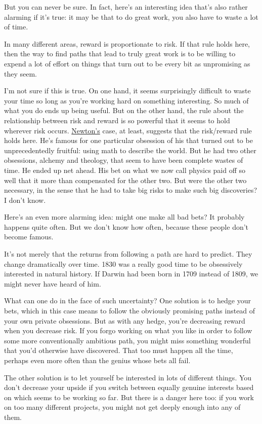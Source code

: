 \documentclass[12pt]{book}
\begin{document}
But you can never be sure. In fact, here's an interesting idea that's
also rather alarming if it's true: it may be that to do great work, you
also have to waste a lot of time.

In many different areas, reward is proportionate to risk. If that rule
holds here, then the way to find paths that lead to truly great work is
to be willing to expend a lot of effort on things that turn out to be
every bit as unpromising as they seem.

I'm not sure if this is true. On one hand, it seems surprisingly
difficult to waste your time so long as you're working hard on something
interesting. So much of what you do ends up being useful. But on the
other hand, the rule about the relationship between risk and reward is
so powerful that it seems to hold wherever risk occurs.
\href{disc.html}{Newton's} case, at least, suggests that the risk/reward
rule holds here. He's famous for one particular obsession of his that
turned out to be unprecedentedly fruitful: using math to describe the
world. But he had two other obsessions, alchemy and theology, that seem
to have been complete wastes of time. He ended up net ahead. His bet on
what we now call physics paid off so well that it more than compensated
for the other two. But were the other two necessary, in the sense that
he had to take big risks to make such big discoveries? I don't know.

Here's an even more alarming idea: might one make all bad bets? It
probably happens quite often. But we don't know how often, because these
people don't become famous.

It's not merely that the returns from following a path are hard to
predict. They change dramatically over time. 1830 was a really good time
to be obsessively interested in natural history. If Darwin had been born
in 1709 instead of 1809, we might never have heard of him.

What can one do in the face of such uncertainty? One solution is to
hedge your bets, which in this case means to follow the obviously
promising paths instead of your own private obsessions. But as with any
hedge, you're decreasing reward when you decrease risk. If you forgo
working on what you like in order to follow some more conventionally
ambitious path, you might miss something wonderful that you'd otherwise
have discovered. That too must happen all the time, perhaps even more
often than the genius whose bets all fail.

The other solution is to let yourself be interested in lots of different
things. You don't decrease your upside if you switch between equally
genuine interests based on which seems to be working so far. But there
is a danger here too: if you work on too many different projects, you
might not get deeply enough into any of them.
\end{document}

